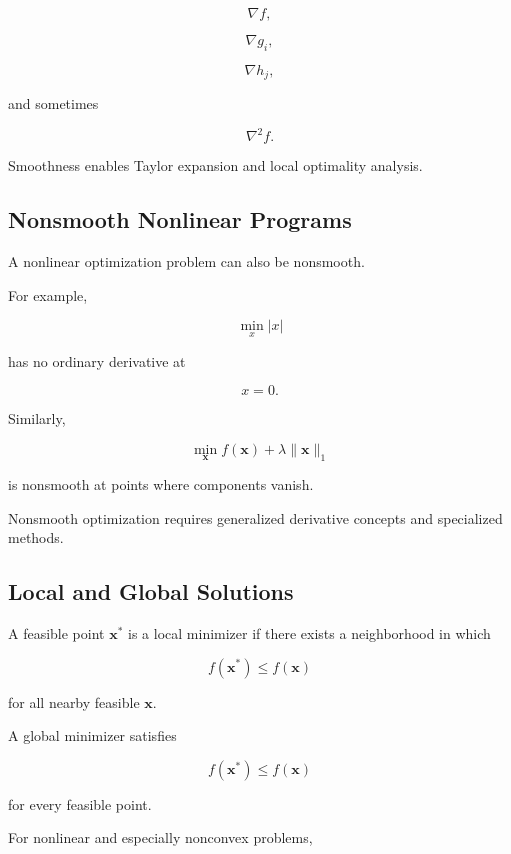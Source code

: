 \[
\boxed{
\nabla f,
}
\]

\[
\boxed{
\nabla g_i,
}
\]

\[
\boxed{
\nabla h_j,
}
\]

and sometimes

\[
\boxed{
\nabla^2 f.
}
\]

Smoothness enables Taylor expansion and local optimality analysis.

\subsection{Nonsmooth Nonlinear Programs}
\label{subsec:nonsmooth-nonlinear-programs}

A nonlinear optimization problem can also be nonsmooth.

For example,

\[
\boxed{
\min_x
|x|
}
\]

has no ordinary derivative at

\[
x=0.
\]

Similarly,

\[
\boxed{
\min_{\mathbf{x}}
f(\mathbf{x})
+
\lambda
\|\mathbf{x}\|_1
}
\]

is nonsmooth at points where components vanish.

Nonsmooth optimization requires generalized derivative concepts and
specialized methods.

\subsection{Local and Global Solutions}
\label{subsec:nlp-local-global-solutions}

A feasible point \(\mathbf{x}^*\) is a local minimizer if there exists a
neighborhood in which

\[
\boxed{
f(\mathbf{x}^*)
\leq
f(\mathbf{x})
}
\]

for all nearby feasible \(\mathbf{x}\).

A global minimizer satisfies

\[
\boxed{
f(\mathbf{x}^*)
\leq
f(\mathbf{x})
}
\]

for every feasible point.

For nonlinear and especially nonconvex problems,

